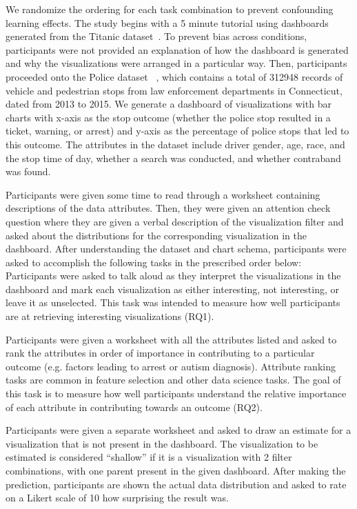 \par We randomize the ordering for each task combination to prevent confounding learning effects. The study begins with a 5 minute tutorial using dashboards generated from the Titanic dataset~\cite{titanic}. To prevent bias across conditions, participants were not provided an explanation of how the dashboard is generated and why the visualizations were arranged in a particular way. Then, participants proceeded onto the Police dataset~\cite{police} %
, which contains a total of 312948 records of vehicle and pedestrian stops from law enforcement departments in Connecticut, dated from 2013 to 2015. We generate a dashboard of visualizations with bar charts with x-axis as the stop outcome (whether the police stop resulted in a ticket, warning, or arrest) and y-axis as the percentage of police stops that led to this outcome. The attributes in the dataset include driver gender, age, race, and the stop time of day, whether a search was conducted, and whether contraband was found.
\par Participants were given some time to read through a worksheet containing descriptions of the data attributes. Then, they were given an attention check question where they are given a verbal description of the visualization filter and asked about the distributions for the corresponding visualization in the dashboard. After understanding the dataset and chart schema, participants were asked to accomplish the following tasks in the prescribed order below:
 Participants were asked to talk aloud as they interpret the visualizations in the dashboard and mark each visualization as either interesting, not interesting, or leave it as unselected. This task was intended to measure how well participants are at retrieving interesting visualizations (RQ1).

 Participants were given a worksheet with all the attributes listed and asked to rank the attributes in order of importance in contributing to a particular outcome (e.g. factors leading to arrest or autism diagnosis). Attribute ranking tasks are common in feature selection and other data science tasks. The goal of this task is to measure how well participants understand the relative importance of each attribute in contributing towards an outcome (RQ2).

 Participants were given a separate worksheet and asked to draw an estimate for a visualization that is not present in the dashboard. The visualization to be estimated is considered ``shallow'' if it is a visualization with 2 filter combinations, with one parent present in the given dashboard. After making the prediction, participants are shown the actual data distribution and asked to rate on a Likert scale of 10 how surprising the result was.

